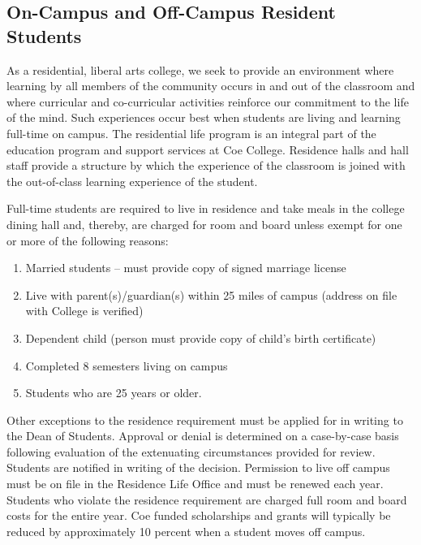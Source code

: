 \documentclass[
  letterpaper,
]{scrbook}
\providecommand{\tightlist}{%
  \setlength{\itemsep}{0pt}\setlength{\parskip}{0pt}}
\begin{document}
\subsection{On-Campus and Off-Campus Resident
Students}\label{sec-full-time-residence-requirements}

As a residential, liberal arts college, we seek to provide an
environment where learning by all members of the community occurs in and
out of the classroom and where curricular and co-curricular activities
reinforce our commitment to the life of the mind. Such experiences occur
best when students are living and learning full-time on campus. The
residential life program is an integral part of the education program
and support services at Coe College. Residence halls and hall staff
provide a structure by which the experience of the classroom is joined
with the out-of-class learning experience of the student.

Full-time students are required to live in residence and take meals in
the college dining hall and, thereby, are charged for room and board
unless exempt for one or more of the following reasons:

\begin{enumerate}
\def\labelenumi{\arabic{enumi}.}
\tightlist
\item
  Married students -- must provide copy of signed marriage license
\item
  Live with parent(s)/guardian(s) within 25 miles of campus (address on
  file with College is verified)
\item
  Dependent child (person must provide copy of child's birth
  certificate)
\item
  Completed 8 semesters living on campus
\item
  Students who are 25 years or older.
\end{enumerate}

Other exceptions to the residence requirement must be applied for in
writing to the Dean of Students. Approval or denial is determined on a
case-by-case basis following evaluation of the extenuating circumstances
provided for review. Students are notified in writing of the decision.
Permission to live off campus must be on file in the Residence Life
Office and must be renewed each year. Students who violate the residence
requirement are charged full room and board costs for the entire year.
Coe funded scholarships and grants will typically be reduced by
approximately 10 percent when a student moves off campus.
\end{document}
